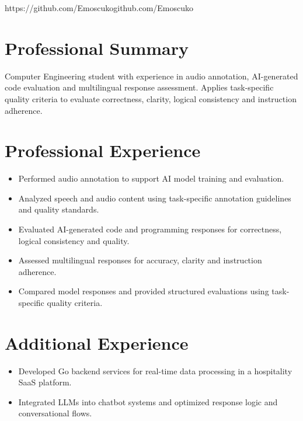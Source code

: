 \documentclass[10pt,a4paper]{article}
\begin{document}
  {https://github.com/Emoscuko}{github.com/Emoscuko}

\section{Professional Summary}
Computer Engineering student with experience in audio annotation, AI-generated code evaluation
and multilingual response assessment. Applies task-specific quality criteria to evaluate
correctness, clarity, logical consistency and instruction adherence.

\section{Professional Experience}
\begin{itemize}
  \item Performed audio annotation to support AI model training and evaluation.
  \item Analyzed speech and audio content using task-specific annotation guidelines and quality standards.
\end{itemize}

\begin{itemize}
  \item Evaluated AI-generated code and programming responses for correctness, logical consistency and quality.
  \item Assessed multilingual responses for accuracy, clarity and instruction adherence.
  \item Compared model responses and provided structured evaluations using task-specific quality criteria.
\end{itemize}

\section{Additional Experience}
\begin{itemize}
  \item Developed Go backend services for real-time data processing in a hospitality SaaS platform.
  \item Integrated LLMs into chatbot systems and optimized response logic and conversational flows.
\end{itemize}
\end{document}
